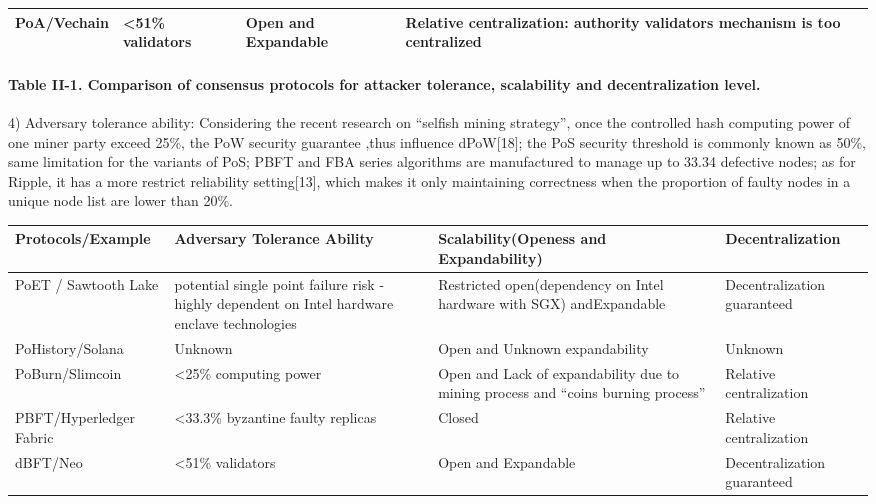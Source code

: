 \documentclass[doublespacing]{bmcart}
\begin{document}
\begin{CJK*}{UTF8}{gbsn}
\begin{tabular}{p{2cm}p{3cm}p{3cm}p{3cm}}
  PoA/Vechain &
 \textless51\% validators &
  Open and Expandable &
  Relative centralization: authority validators mechanism is too centralized\\ \hline
  \end{tabular}
\paragraph{Table II-1. Comparison of consensus protocols for attacker tolerance, scalability and decentralization level.}
	 
4) Adversary tolerance ability:
Considering the recent research on ``selfish mining strategy'', once the controlled hash computing power of one miner party exceed 25\%, the PoW security guarantee ,thus influence dPoW[18]; the PoS security threshold is commonly known as 50\%, same limitation for the variants of PoS; PBFT and FBA series algorithms are manufactured to manage up to 33.34 defective nodes; as for Ripple, it has a more restrict reliability setting[13], which makes it only maintaining correctness when the
proportion of faulty nodes in a unique node list are
lower than 20\%.
  

  \begin{tabular}{p{2cm}p{3cm}p{3cm}p{3cm}}
  \hline
 Protocols/E\-xample  & 
Adversary Tolerance Ability & 
Scalability(Openess and Expandability) & Decentralization \\ \hline
PoET / Sawtooth Lake 
 & potential single point failure risk - highly dependent on Intel hardware enclave technologies  
 & Restricted open(dependency on Intel hardware with SGX) and\newline Expandable 
 & Decentralization guaranteed\\ \hline
 
PoHistory/So\-lana 
& Unknown 
& Open and \newline Unknown expandability 
& Unknown \\ \hline

PoBurn/\newline Slimcoin 
& \textless25\% computing power 
& Open and \newline Lack of expandability due to mining process and ``coins burning process'' 
& Relative centralization \\ \hline

PBFT/Hyp\-erledger Fabric
& \textless33.3\% byzantine faulty replicas 
& Closed 
& Relative centralization \\ \hline

dBFT/Neo 
& \textless51\% validators 
& Open and Expandable 
& Decentralization guaranteed \\ \hline


\end{tabular}
\end{CJK*}
\end{document}
